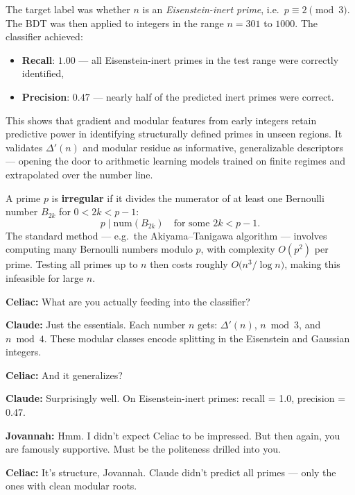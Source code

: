 The target label was whether $n$ is an \emph{Eisenstein-inert prime}, i.e.\ $p \equiv 2 \pmod{3}$.  
The BDT was then applied to integers in the range $n = 301$ to $1000$. The classifier achieved:
\begin{itemize}
  \item \textbf{Recall}: $1.00$ — all Eisenstein-inert primes in the test range were correctly identified,
  \item \textbf{Precision}: $0.47$ — nearly half of the predicted inert primes were correct.
\end{itemize}

This shows that gradient and modular features from early integers retain predictive power in identifying structurally defined primes in unseen regions. It validates $\Delta'(n)$ and modular residue as informative, generalizable descriptors — opening the door to arithmetic learning models trained on finite regimes and extrapolated over the number line.

\begin{tcolorbox}[
  title=Why Irregular Prime Prediction is Hard,
  colback=blue!5!white,
  colframe=blue!75!black,
  boxrule=0.8pt,
  arc=6pt,
  left=6pt,right=6pt,top=6pt,bottom=6pt
]
A prime $p$ is \textbf{irregular} if it divides the numerator of at least one Bernoulli number $B_{2k}$ for $0<2k<p-1$:
\[
p \mid \mathrm{num}(B_{2k}) \quad \text{for some $2k<p-1$.}
\]
The standard method — e.g.\ the Akiyama–Tanigawa algorithm — involves computing many Bernoulli numbers modulo $p$, with complexity $O(p^{2})$ per prime. Testing all primes up to $n$ then costs roughly $O\!\bigl(n^{3}/\log n\bigr)$, making this infeasible for large $n$.
\end{tcolorbox}

\noindent\textbf{Celiac:} What are you actually feeding into the classifier?  

\noindent\textbf{Claude:} Just the essentials. Each number $n$ gets: $\Delta'(n)$, $n\bmod3$, and $n\bmod4$. These modular classes encode splitting in the Eisenstein and Gaussian integers.  

\noindent\textbf{Celiac:} And it generalizes?  

\noindent\textbf{Claude:} Surprisingly well. On Eisenstein-inert primes: recall = 1.0, precision = 0.47.  

\noindent\textbf{Jovannah:} Hmm. I didn’t expect Celiac to be impressed. But then again, you are famously supportive. Must be the politeness drilled into you.  

\noindent\textbf{Celiac:} It’s structure, Jovannah. Claude didn’t predict all primes — only the ones with clean modular roots.  

